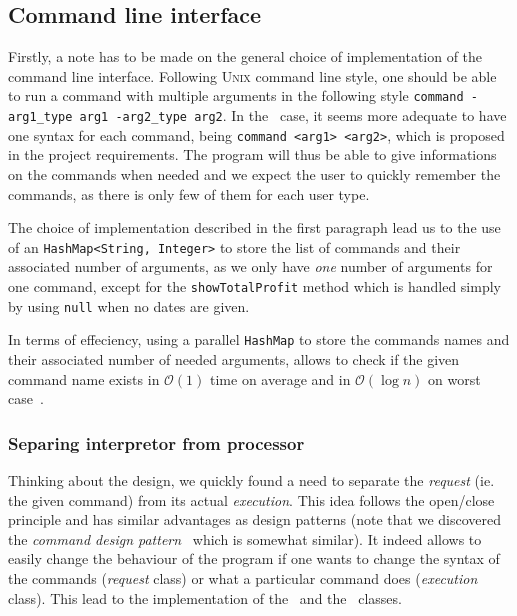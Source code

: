 
\subsection{Command line interface} %
\label{sub:command_line_interface}

Firstly, a note has to be made on the general choice of implementation
of the command line interface.
Following \textsc{Unix} command line style, one should be able to run
a command with multiple arguments in the following
style \lstinline|command -arg1_type arg1 -arg2_type arg2|.
In the \MyFoodora~case, it seems more adequate to have one syntax for each
command, being \lstinline|command <arg1> <arg2>|, which is proposed in 
the project requirements. The program will thus be able to give informations
on the commands when needed and we expect the user to quickly remember 
the commands, as there is only few of them for each user type.
 
The choice of implementation described in the first paragraph
lead us to the use of an \lstinline|HashMap<String, Integer>| to
store the list of commands and their associated number of arguments,
as we only have \emph{one} number of arguments for one command,
except for the \lstinline|showTotalProfit| method which is handled
simply by using \lstinline|null| when no dates are given.

In terms of effeciency, using a parallel \lstinline|HashMap| to store
the commands names and their associated number of needed arguments,
allows to check if the given command name exists in $\mathcal{O}(1)$
time on average and in $\mathcal{O}(\log{n})$ on worst case~\cite{hashMap}.

\subsubsection{Separing interpretor from processor} %
\label{sub:separing_command_getter_and_command_processor}

Thinking about the design, we quickly found a need to separate
the \emph{request} (ie. the given command) from its actual \emph{execution}.
This idea follows the open/close principle and has similar advantages
as design patterns (note that we discovered the \emph{command design pattern}~\cite{wiki:commandPattern} which is somewhat similar).
It indeed allows to easily change the behaviour of the program if
one wants to change the syntax of the commands (\emph{request} class)
or what a particular command does (\emph{execution} class).
This lead to the implementation of the \CommandLine~and
the \CommandProcessor~classes.

